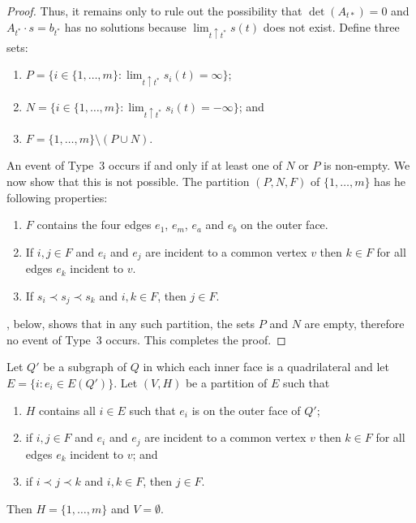 \documentclass{patmorin}
\begin{document}
\begin{proof}
   Thus, it remains only to rule out the possibility that $\det(A_{t*})=0$
   and $A_{t^*}\cdot s=b_{t^*}$ has no solutions because $\lim_{t\uparrow
   t^*} s(t)$ does not exist.  Define three sets:
   \begin{enumerate}
     \item $P=\{i\in \{1,\ldots,m\}:\lim_{t\uparrow t^*} s_i(t)=\infty\}$;
     \item $N=\{i\in \{1,\ldots,m\}:\lim_{t\uparrow t^*} s_i(t)=-\infty\}$; and
     \item $F=\{1,\ldots,m\}\setminus (P\cup N)$.
   \end{enumerate}
   An event of Type~3 occurs if and only if at least one of $N$ or $P$
   is non-empty.  We now show that this is not possible.  The partition
   $(P,N,F)$ of $\{1,\ldots,m\}$ has he following
   properties:
   \begin{enumerate}
    \item $F$ contains the four edges $e_1$, $e_m$, $e_a$ and $e_b$
      on the outer face.
    \item If $i,j\in F$ and $e_i$ and $e_j$ are incident to a common
      vertex $v$ then $k\in F$ for all edges $e_k$ incident to $v$.
    \item If $s_i \prec s_j \prec s_k$ and $i,k\in F$, 
      then $j\in F$.
   \end{enumerate}
   , below, shows that in any such partition, the sets
   $P$ and $N$ are empty, therefore no event of Type~3 occurs.  This 
   completes the proof.
\end{proof}

\begin{lem}
   Let $Q'$ be a subgraph of $Q$ in which each inner face is a
   quadrilateral and let $E=\{i:e_i\in E(Q')\}$.  Let $(V,H)$ be a
   partition of $E$ such that
   \begin{enumerate}
    \item $H$ contains all $i\in E$ such that $e_i$ is on the outer face 
      of $Q'$;
    \item if $i,j\in F$ and $e_i$ and $e_j$ are incident to a common
      vertex $v$ then $k\in F$ for all edges $e_k$ incident to $v$; and
    \item if $i \prec j \prec k$ and $i,k\in F$, 
      then $j\in F$.
   \end{enumerate}
   Then $H=\{1,\ldots,m\}$ and $V=\emptyset$.
\end{lem}
\end{document}
